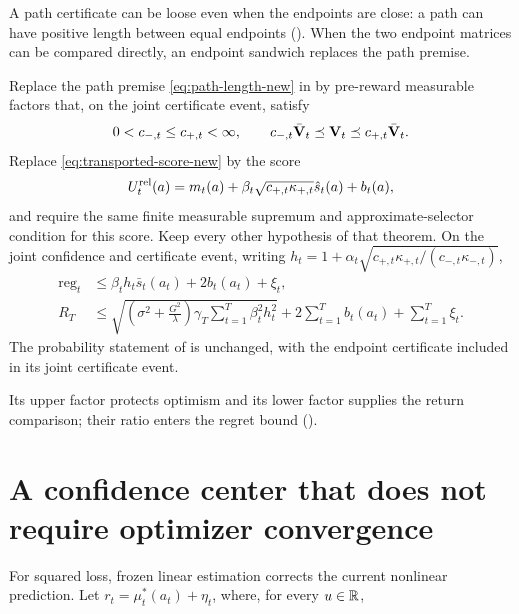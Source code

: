 A path certificate can be loose even when the endpoints are close: a path
can have positive length between equal endpoints ().
When the two endpoint matrices can be compared directly, an endpoint sandwich
replaces the path premise.

\begin{corollary}
\label{cor:relative-endpoint-ucb}
Replace the path premise \eqref{eq:path-length-new} in
 by pre-reward measurable factors that, on the joint
certificate event, satisfy
\begin{equation}\label{eq:relative-endpoint-sandwich}
 0<c_{-,t}\le c_{+,t}<\infty,\qquad
 c_{-,t}\bar{\mathbf{V}}_t\preceq\mathbf{V}_t\preceq c_{+,t}\bar{\mathbf{V}}_t.
\end{equation}
Replace \eqref{eq:transported-score-new} by the score
\begin{equation}\label{eq:relative-endpoint-score}
 U_t^{\rm rel}(a)=m_t(a)+\beta_t\sqrt{c_{+,t}\kappa_{+,t}}
 \hat s_t(a)+b_t(a),
\end{equation}
and require the same finite measurable supremum and approximate-selector
condition for this score.  Keep every other hypothesis of that theorem.
On the joint confidence and certificate event, writing
$h_t=1+\alpha_t\sqrt{c_{+,t}\kappa_{+,t}/(c_{-,t}\kappa_{-,t})}$,
\begin{align}
 \operatorname{reg}_t
 &\le\beta_t h_t\bar s_t(a_t)+2b_t(a_t)+\xi_t,\nonumber\\
 R_T&\le\sqrt{\left(\sigma^2+\frac{G^2}{\lambda}\right)
 \gamma_T\sum_{t=1}^T\beta_t^2h_t^2}
 +2\sum_{t=1}^Tb_t(a_t)+\sum_{t=1}^T\xi_t.
 \label{eq:relative-endpoint-regret}
\end{align}
The probability statement of  is unchanged, with
the endpoint certificate included in its joint certificate event.
\end{corollary}

Its upper factor protects optimism and its lower factor supplies the return
comparison; their ratio enters the regret bound
().

\section{A confidence center that does not require optimizer convergence}
\label{sec:corrected-center}

For squared loss, frozen linear estimation corrects the current nonlinear
prediction. Let $r_t=\mu_t^*(a_t)+\eta_t$, where, for every $u\in\mathbb{R}$,

